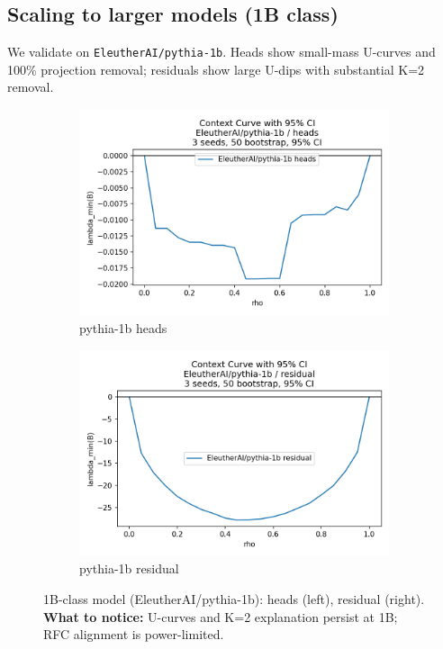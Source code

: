 \documentclass[11pt]{article}
\newcommand{\1}{\mathbf{1}}
\begin{document}
\subsection{Scaling to larger models (1B class)} \label{sec:scaling}
We validate on \texttt{EleutherAI/pythia-1b}. Heads show small-mass U-curves and 100\% projection removal; residuals show large U-dips with substantial K{=}2 removal.

\begin{figure}[t]
\centering
\begin{subfigure}[t]{0.48\textwidth}
\includegraphics[width=\linewidth]{figs/curve_EleutherAI_pythia-1b_heads.png}
\caption{pythia-1b heads}
\end{subfigure}\hfill
\begin{subfigure}[t]{0.48\textwidth}
\includegraphics[width=\linewidth]{figs/curve_EleutherAI_pythia-1b_residual.png}
\caption{pythia-1b residual}
\end{subfigure}
\caption{1B-class model (EleutherAI/pythia-1b): heads (left), residual (right). \textbf{What to notice:} U-curves and K{=}2 explanation persist at 1B; RFC alignment is power-limited.}
\label{fig:curve_big_heads_real}
\end{figure}
\end{document}
